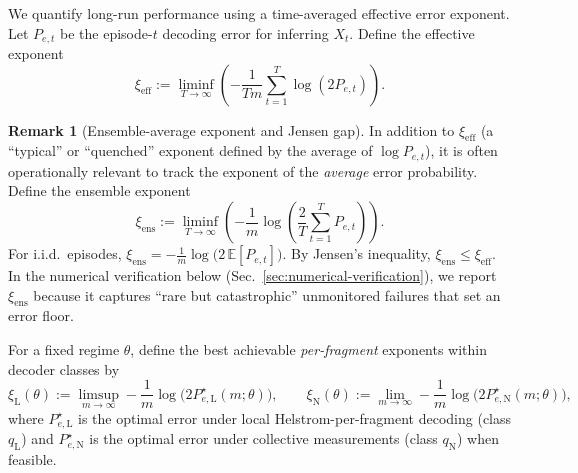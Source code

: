 \documentclass[11pt]{article}
\newcommand{\E}{\mathbb{E}}
\newcommand{\1}{\mathbf{1}}
\newcommand{\QCBdist}{\xi}
\theoremstyle{definition}
\newtheorem{remark}{Remark}
\theoremstyle{plain}
\begin{document}
We quantify long-run performance using a time-averaged effective error exponent.
Let $P_{e,t}$ be the episode-$t$ decoding error for inferring $X_t$.
Define the effective exponent
\begin{equation}
\QCBdist_{\mathrm{eff}}
:=
\liminf_{T\to\infty}
\left(
-\frac{1}{Tm}
\sum_{t=1}^{T}\log(2P_{e,t})
\right).
\label{eq:xi-eff}
\end{equation}
\begin{remark}[Ensemble-average exponent and Jensen gap]
In addition to $\QCBdist_{\mathrm{eff}}$ (a ``typical'' or ``quenched'' exponent defined by the average of $\log P_{e,t}$), it is often operationally relevant to track the exponent of the \emph{average} error probability.
Define the ensemble exponent
\[
\QCBdist_{\mathrm{ens}}
:=
\liminf_{T\to\infty}
\left(
-\frac{1}{m}\log\!\left(\frac{2}{T}\sum_{t=1}^{T} P_{e,t}\right)
\right).
\]
For i.i.d.\ episodes, $\QCBdist_{\mathrm{ens}} = -\frac1m\log\!\bigl(2\,\E[P_{e,t}]\bigr)$.
By Jensen's inequality, $\QCBdist_{\mathrm{ens}}\le \QCBdist_{\mathrm{eff}}$.
In the numerical verification below (Sec.~\ref{sec:numerical-verification}), we report $\QCBdist_{\mathrm{ens}}$ because it captures ``rare but catastrophic'' unmonitored failures that set an error floor.
\end{remark}

For a fixed regime $\theta$, define the best achievable \emph{per-fragment} exponents within decoder classes by
\[
\QCBdist_{\mathrm{L}}(\theta):=
\limsup_{m\to\infty}-\frac{1}{m}\log\!\bigl(2P_{e,\mathrm{L}}^\star(m;\theta)\bigr),
\qquad
\QCBdist_{\mathrm{N}}(\theta):=
\lim_{m\to\infty}-\frac{1}{m}\log\!\bigl(2P_{e,\mathrm{N}}^\star(m;\theta)\bigr),
\]
where $P_{e,\mathrm{L}}^\star$ is the optimal error under local Helstrom-per-fragment decoding (class $q_{\mathrm{L}}$) and $P_{e,\mathrm{N}}^\star$ is the optimal error under collective measurements (class $q_{\mathrm{N}}$) when feasible.
\end{document}
